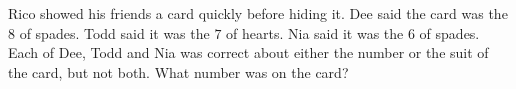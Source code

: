 Rico showed his friends a card quickly before hiding it. Dee said the card was the $8$ of spades. Todd said it was the $7$ of hearts. Nia said it was the $6$ of spades. Each of Dee, Todd and Nia was correct about either the number or the suit of the card, but not both. What number was on the card?
